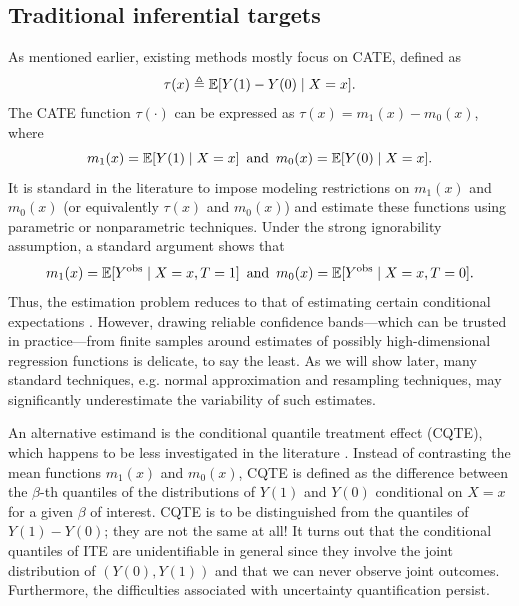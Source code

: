 \subsection{Traditional inferential targets}
As mentioned earlier, existing methods mostly focus on CATE, defined
as
\begin{equation}
  \label{eq:CATE}
  \tau(x) \triangleq \mathbb{E} [Y(1) - Y(0) \mid X = x].
\end{equation}
The CATE function $\tau(\cdot)$ can be expressed as
$\tau(x) = m_{1}(x) - m_{0}(x)$, where
\[
m_{1}(x) = \mathbb{E} [Y(1) \mid X = x] \, \text{ and } \,  m_{0}(x) = \mathbb{E} [Y(0) \mid X =
x].
\]
It is standard in the literature to impose modeling restrictions on
$m_{1}(x)$ and $m_{0}(x)$ (or equivalently $\tau(x)$ and $m_{0}(x)$)
and estimate these functions using parametric or nonparametric
techniques. Under the strong ignorability assumption, a standard
argument shows that
\[m_{1}(x) = \mathbb{E} [Y^{\mathrm{obs}} \mid X = x, T = 1] \, \text{ and } \,
  m_{0}(x) = \mathbb{E} [Y^{\mathrm{obs}} \mid X = x, T = 0].\] Thus, the estimation
problem reduces to that of estimating certain conditional
  expectations \citep[e.g.][]{nie2017quasi, foster2019orthogonal,
    kennedy2020optimal}. However, drawing reliable confidence
bands---which can be trusted in practice---from finite samples around
estimates of possibly high-dimensional regression functions
is delicate,
to say the least.  As we will show later, many standard techniques,
e.g. normal approximation and resampling techniques, may significantly
underestimate the variability of such estimates.

An alternative estimand is the conditional quantile treatment effect
(CQTE), which happens to be less investigated in the literature
\citep[e.g.][]{koenker1978regression, fort2016unconditional}. Instead of contrasting the mean
functions $m_{1}(x)$ and $m_{0}(x)$, %
CQTE is defined as the difference between the $\beta$-th quantiles of
the distributions of $Y(1)$ and $Y(0)$ conditional on $X = x$ for a
given $\beta$ of interest. 
CQTE is to be distinguished from the quantiles of
$Y(1) - Y(0)$; they are not the same at all!
It turns out that the conditional quantiles of ITE are unidentifiable
in general since they involve the joint distribution of $(Y(0), Y(1))$
and that we can never observe joint outcomes.  Furthermore, the
difficulties associated with uncertainty quantification
persist.
 
